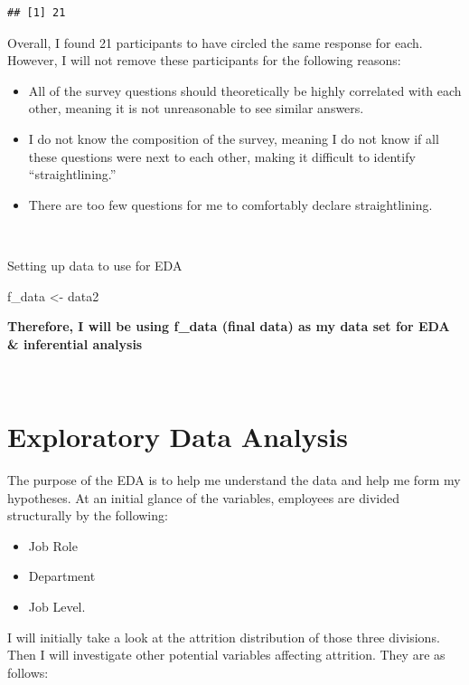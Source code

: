 \documentclass[
]{article}
\newenvironment{Shaded}{\begin{snugshade}}{\end{snugshade}}
\newcommand{\NormalTok}[1]{#1}
\newcommand{\StringTok}[1]{\textcolor[rgb]{0.31,0.60,0.02}{#1}}
\providecommand{\tightlist}{%
  \setlength{\itemsep}{0pt}\setlength{\parskip}{0pt}}
\begin{document}
\begin{verbatim}
## [1] 21
\end{verbatim}

Overall, I found 21 participants to have circled the same response for
each. However, I will not remove these participants for the following
reasons:

\begin{itemize}
\tightlist
\item
  All of the survey questions should theoretically be highly correlated
  with each other, meaning it is not unreasonable to see similar
  answers.
\item
  I do not know the composition of the survey, meaning I do not know if
  all these questions were next to each other, making it difficult to
  identify ``straightlining.''
\item
  There are too few questions for me to comfortably declare
  straightlining.
\end{itemize}

~ ~

Setting up data to use for EDA

\begin{Shaded}
\begin{Highlighting}[]
\NormalTok{f_data <-}\StringTok{ }\NormalTok{data2}
\end{Highlighting}
\end{Shaded}

\textbf{Therefore, I will be using f\_data (final data) as my data set
for EDA \& inferential analysis}

~ ~

\hypertarget{exploratory-data-analysis}{%
\section{Exploratory Data Analysis}\label{exploratory-data-analysis}}

The purpose of the EDA is to help me understand the data and help me
form my hypotheses. At an initial glance of the variables, employees are
divided structurally by the following:

\begin{itemize}
\tightlist
\item
  Job Role
\item
  Department
\item
  Job Level.
\end{itemize}

I will initially take a look at the attrition distribution of those
three divisions. Then I will investigate other potential variables
affecting attrition. They are as follows:
\end{document}
